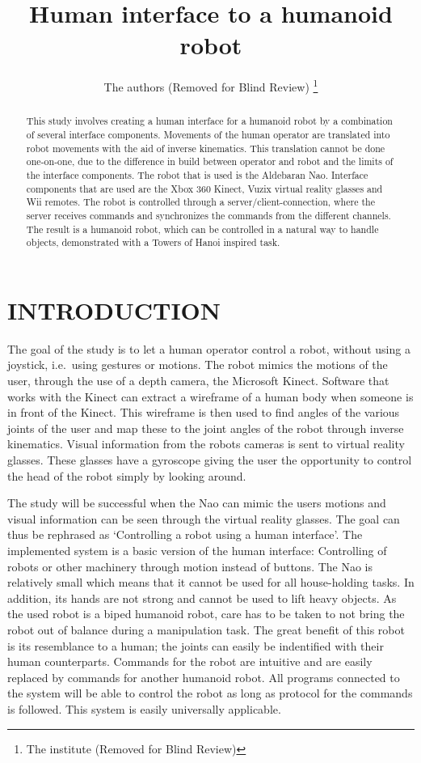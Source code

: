 \documentclass[letterpaper, 10pt, conference]{ieeeconf}
\title{\LARGE \bf
Human interface to a humanoid robot}
\author{The authors (Removed for Blind Review)
\thanks{The institute (Removed for Blind Review)}
}
\begin{document}
\maketitle
\thispagestyle{empty}
\pagestyle{empty}

\begin{abstract}
This study involves creating a human interface for a humanoid robot by a combination of several interface components. Movements of the human operator are
translated into robot movements with the aid of inverse kinematics. 
This translation cannot be done one-on-one, due to the difference in build between operator and robot and the limits of the interface components. 
The robot that is used is the Aldebaran Nao. Interface components that are used are the Xbox 360 Kinect, Vuzix virtual reality glasses and Wii remotes. 
The robot is controlled through a server/client-connection, where the server receives commands and synchronizes the commands from the different channels. 
The result is a humanoid robot, which can be controlled in a natural way to handle objects, demonstrated with a Towers of Hanoi inspired task.
\end{abstract}

\section{INTRODUCTION}
The goal of the study is to let a human operator control a robot, without using a joystick, i.e.\ using gestures or motions. 
The robot mimics the motions of the user, through the use of a depth camera, the Microsoft Kinect. 
Software that works with the Kinect can extract a wireframe of a human body when someone is in front of the Kinect. 
This wireframe is then used to find angles of the various joints of the user and map these to the joint angles of the robot through inverse kinematics. Visual information from the robots cameras is sent to virtual reality glasses. These glasses have a gyroscope giving the user the opportunity to control the head of the robot simply by looking around.

The study will be successful when the Nao can mimic the users motions and visual information can be seen through the virtual reality glasses. 
The goal can thus be rephrased as `Controlling a robot using a human interface'.
The implemented system is a basic version of the human interface: Controlling of robots or other machinery through motion instead of buttons. 
The Nao is relatively small which means that it cannot be used for all house-holding tasks. In addition, its hands are not strong and cannot be used to lift heavy objects. 
As the used robot is a biped humanoid robot, care has to be taken to not bring the robot out of balance during a manipulation task. 
The great benefit of this robot is its resemblance to a human; the joints can easily be indentified with their human counterparts.
Commands for the robot are intuitive and are easily replaced by commands for another humanoid robot. All programs connected to the system will be able to control the robot as long as protocol for the commands is followed. This system is easily universally applicable.
\end{document}
